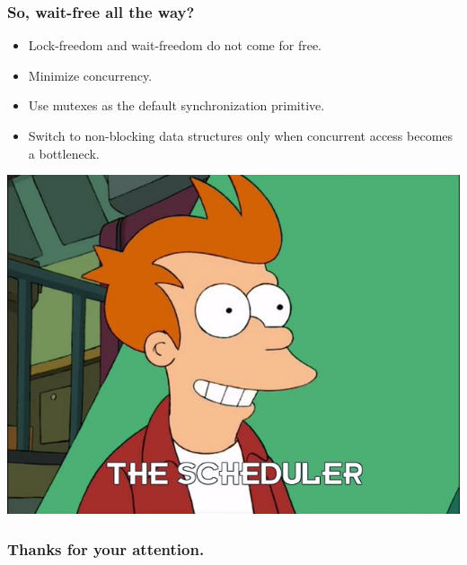 \documentclass{beamer}
\newif\iftransitions
\begin{document}
\begin{frame}
  \frametitle{So, wait-free all the way?}
  
  \iftransitions \pause \fi
  
  \begin{itemize}
    \setlength\itemsep{1.5em}
    \item Lock-freedom and wait-freedom do not come for free.
    
    \iftransitions \pause \fi
    
    \item Minimize concurrency.
    
    \iftransitions \pause \fi
    
    \item Use mutexes as the default synchronization primitive.
    
    \iftransitions \pause \fi
    
    \item Switch to non-blocking data structures only when concurrent access becomes a bottleneck.
  \end{itemize}
\end{frame}

\begin{frame}

\begin{center}
  \includegraphics[height=0.7\textheight]{resources/fry-scheduler.jpg}
\end{center}

\end{frame}


\begin{frame}
  \frametitle{Thanks for your attention.}
\end{frame}
\end{document}
